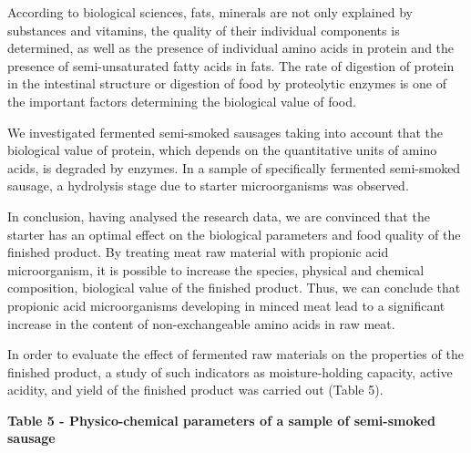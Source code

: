 According to biological sciences, fats, minerals are not only explained
by substances and vitamins, the quality of their individual components
is determined, as well as the presence of individual amino acids in
protein and the presence of semi-unsaturated fatty acids in fats. The
rate of digestion of protein in the intestinal structure or digestion of
food by proteolytic enzymes is one of the important factors determining
the biological value of food.

We investigated fermented semi-smoked sausages taking into account that
the biological value of protein, which depends on the quantitative units
of amino acids, is degraded by enzymes. In a sample of specifically
fermented semi-smoked sausage, a hydrolysis stage due to starter
microorganisms was observed.

In conclusion, having analysed the research data, we are convinced that
the starter has an optimal effect on the biological parameters and food
quality of the finished product. By treating meat raw material with
propionic acid microorganism, it is possible to increase the species,
physical and chemical composition, biological value of the finished
product. Thus, we can conclude that propionic acid microorganisms
developing in minced meat lead to a significant increase in the content
of non-exchangeable amino acids in raw meat.

In order to evaluate the effect of fermented raw materials on the
properties of the finished product, a study of such indicators as
moisture-holding capacity, active acidity, and yield of the finished
product was carried out (Table 5).

{\bfseries Table 5 - Physico-chemical parameters of a sample of semi-smoked
sausage}


